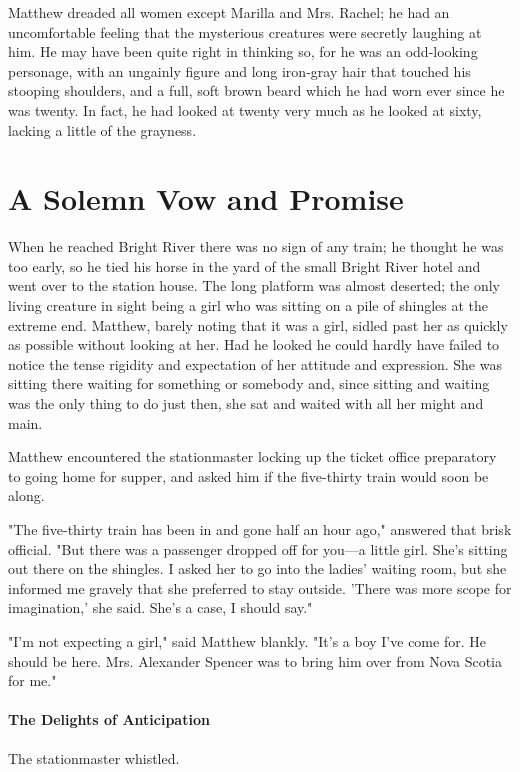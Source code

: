 \documentclass{article}
\begin{document}
Matthew dreaded all women except Marilla and Mrs. Rachel; he had an uncomfortable feeling that the mysterious creatures were secretly laughing at him. He may have been quite right in thinking so, for he was an odd-looking personage, with an ungainly figure and long iron-gray hair that touched his stooping shoulders, and a full, soft brown beard which he had worn ever since he was twenty. In fact, he had looked at twenty very much as he looked at sixty, lacking a little of the grayness.

\section{A Solemn Vow and Promise}
When he reached Bright River there was no sign of any train; he thought he was too early, so he tied his horse in the yard of the small Bright River hotel and went over to the station house. The long platform was almost deserted; the only living creature in sight being a girl who was sitting on a pile of shingles at the extreme end. Matthew, barely noting that it was a girl, sidled past her as quickly as possible without looking at her. Had he looked he could hardly have failed to notice the tense rigidity and expectation of her attitude and expression. She was sitting there waiting for something or somebody and, since sitting and waiting was the only thing to do just then, she sat and waited with all her might and main.

Matthew encountered the stationmaster locking up the ticket office preparatory to going home for supper, and asked him if the five-thirty train would soon be along.

"The five-thirty train has been in and gone half an hour ago," answered that brisk official. "But there was a passenger dropped off for you---a little girl. She's sitting out there on the shingles. I asked her to go into the ladies' waiting room, but she informed me gravely that she preferred to stay outside. 'There was more scope for imagination,' she said. She's a case, I should say."

"I'm not expecting a girl," said Matthew blankly. "It's a boy I've come for. He should be here. Mrs. Alexander Spencer was to bring him over from Nova Scotia for me."

\paragraph{The Delights of Anticipation}
The stationmaster whistled.
\end{document}
